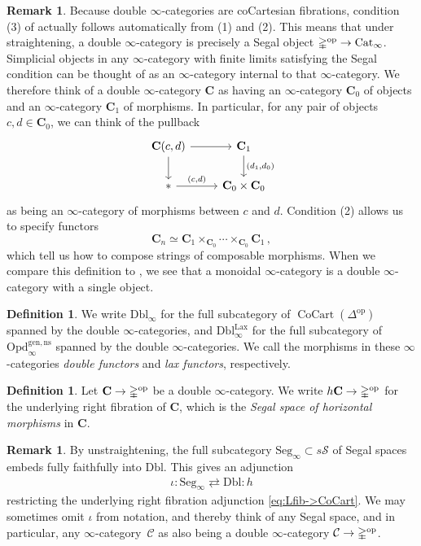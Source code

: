 \documentclass[10pt]{amsart}
\numberwithin{equation}{section}
\theoremstyle{definition}
\newtheorem{definition}[prop]{Definition}
\newtheorem{rem}[prop]{Remark}
\DeclareMathOperator{\op}{op}
\DeclareMathOperator{\Lax}{Lax}
\DeclareMathOperator{\CoCart}{CoCart}
\newcommand{\Cat}{\mathrm{Cat}\vphantom{t}}
\newcommand{\Simp}{\mathbb{\Delta}}
\newcommand{\cC}{\mathcal{C}}
\newcommand{\cS}{\mathcal{S}}
\newcommand{\bfC}{\mathbf{C}}
\newcommand{\Opd}{\mathrm{Opd}^{\mathrm{gen,ns}}_{\infty}}
\newcommand{\Dbl}{\mathrm{Dbl}}
\newcommand{\DblLax}{ \mathrm{Dbl}_{\infty}^{\Lax}  }
\newcommand{\Seg}{\mathrm{Seg}_{\infty}}
\renewcommand{\to}{\mathchoice{\longrightarrow}{\rightarrow}{}{}}
\begin{document}
	\begin{rem}\label{rem:double_is_segal_cat}
		Because double $\infty$-categories are coCartesian fibrations, condition (3) of  actually follows automatically from (1) and (2).
		This means that under straightening, a double $\infty$-category is precisely a Segal object $\Simp^{\op} \to \Cat_{\infty}$.
		Simplicial objects in any $\infty$-category with finite limits satisfying the Segal condition can be thought of as an $\infty$-category internal to that $\infty$-category.
		We therefore think of a double $\infty$-category $\bfC$ as having an $\infty$-category $\bfC_{0}$ of objects and an $\infty$-category $\bfC_{1}$ of morphisms. In particular, for any pair of objects $c,d\in \bfC_{0}$, we can think of the pullback
		\begin{equation*}
			\begin{tikzcd}
				\bfC(c,d) \arrow[r] \arrow[d]      &   \bfC_{1}  \arrow[d, "{(d_{1},d_{0})}"] \\
				\ast  \arrow[r, "{(c,d)}"]               &   \bfC_{0}\times \bfC_{0}
			\end{tikzcd}
		\end{equation*}
		as being an $\infty$-category of morphisms between $c$ and $d$. Condition (2) allows us to specify functors
		\[
		\bfC_{n} \simeq \bfC_{1} \times_{\bfC_{0}} \cdots \times_{\bfC_{0}} \bfC_{1} \, ,
		\]
		which tell us how to compose strings of composable morphisms.
		When we compare this definition to , we see that a monoidal $\infty$-category is a double $\infty$-category with a single object.
	\end{rem}


	\begin{definition}\label{def:Dbl_and_DblLax}
		We write $\Dbl_{\infty}$ for the full subcategory of $\CoCart(\Simp^{\op})$ spanned by the double $\infty$-categories, and $\DblLax$ for the full subcategory of $\Opd$ spanned by the double $\infty$-categories.
		We call the morphisms in these $\infty$-categories \emph{double functors} and \emph{lax functors}, respectively.
	\end{definition}
	\begin{definition}\label{def:horizontal_morphisms}
		Let $\bfC\to \Simp^{\op}$ be a double $\infty$-category. We write $h\bfC\to \Simp^{\op}$ for the underlying right fibration of $\bfC$, which is the \emph{Segal space of horizontal morphisms} in $\bfC$.
	\end{definition}
	\begin{rem}\label{rem:horizontal_morph_adjunction}
		By unstraightening, the full subcategory $\Seg \subset s\cS$ of Segal spaces embeds fully faithfully into $\Dbl$. This gives an adjunction
		\begin{align*}
			\iota : \Seg \rightleftarrows \Dbl : h
		\end{align*}
		restricting the underlying right fibration adjunction \eqref{eq:Lfib->CoCart}.
    We may sometimes omit $\iota$ from notation, and thereby think of any Segal space, and in particular, any $\infty$-category~$\cC$ as also being a double $\infty$-category $\cC\to \Simp^{\op}$.
	\end{rem}
\end{document}
